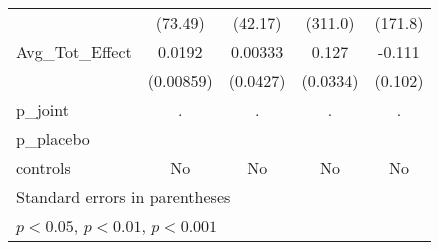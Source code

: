 {\begin{tabular}{l*{4}{c}}
            &     (73.49)         &     (42.17)         &     (311.0)         &     (171.8)         \\
\addlinespace
Avg\_Tot\_Effect&      0.0192\sym{*}  &     0.00333         &       0.127\sym{***}&      -0.111         \\
            &   (0.00859)         &    (0.0427)         &    (0.0334)         &     (0.102)         \\
\midrule
p\_joint     &           .         &           .         &           .         &           .         \\
p\_placebo   &                     &                     &                     &                     \\
controls    &          No         &          No         &          No         &          No         \\
\bottomrule
\multicolumn{5}{l}{\footnotesize Standard errors in parentheses}\\
\multicolumn{5}{l}{\footnotesize \sym{*} \(p<0.05\), \sym{**} \(p<0.01\), \sym{***} \(p<0.001\)}\\
\end{tabular}
}
